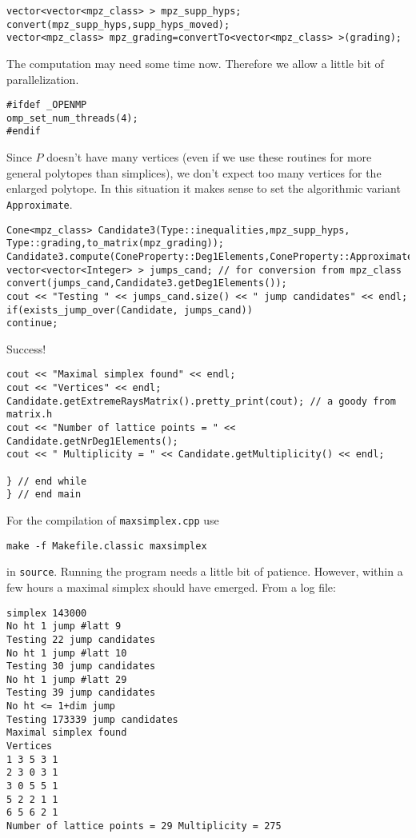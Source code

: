 \documentclass[12pt,a4paper]{scrartcl}
\theoremstyle{definition}
\begin{document}
\begin{small}
\begin{Verbatim}
vector<vector<mpz_class> > mpz_supp_hyps;
convert(mpz_supp_hyps,supp_hyps_moved);
vector<mpz_class> mpz_grading=convertTo<vector<mpz_class> >(grading);
\end{Verbatim}
The computation may need some time now. Therefore we allow a little bit of parallelization.
\begin{Verbatim}
#ifdef _OPENMP
omp_set_num_threads(4);
#endif
\end{Verbatim}
Since $P$ doesn't have many vertices (even if we use these routines for more general polytopes than simplices), we don't expect too many vertices for the enlarged polytope. In this situation it makes sense to set the algorithmic variant \verb|Approximate|.
\begin{Verbatim}
Cone<mpz_class> Candidate3(Type::inequalities,mpz_supp_hyps,
Type::grading,to_matrix(mpz_grading));
Candidate3.compute(ConeProperty::Deg1Elements,ConeProperty::Approximate);
vector<vector<Integer> > jumps_cand; // for conversion from mpz_class                           
convert(jumps_cand,Candidate3.getDeg1Elements());
cout << "Testing " << jumps_cand.size() << " jump candidates" << endl;
if(exists_jump_over(Candidate, jumps_cand))
continue;
\end{Verbatim}
Success!
\begin{Verbatim}
cout << "Maximal simplex found" << endl;
cout << "Vertices" << endl;
Candidate.getExtremeRaysMatrix().pretty_print(cout); // a goody from matrix.h
cout << "Number of lattice points = " << Candidate.getNrDeg1Elements();
cout << " Multiplicity = " << Candidate.getMultiplicity() << endl; 

} // end while
} // end main
\end{Verbatim}

For the compilation of \verb|maxsimplex.cpp| use
\begin{Verbatim}
make -f Makefile.classic maxsimplex
\end{Verbatim}
in \verb|source|. Running the program needs a little bit of patience. However, within a few hours a maximal simplex should have emerged. From a log file:
\begin{Verbatim}
simplex 143000
No ht 1 jump #latt 9
Testing 22 jump candidates
No ht 1 jump #latt 10
Testing 30 jump candidates
No ht 1 jump #latt 29
Testing 39 jump candidates
No ht <= 1+dim jump
Testing 173339 jump candidates
Maximal simplex found
Vertices
1 3 5 3 1
2 3 0 3 1
3 0 5 5 1
5 2 2 1 1
6 5 6 2 1
Number of lattice points = 29 Multiplicity = 275
\end{Verbatim}

\end{small}
\end{document}
